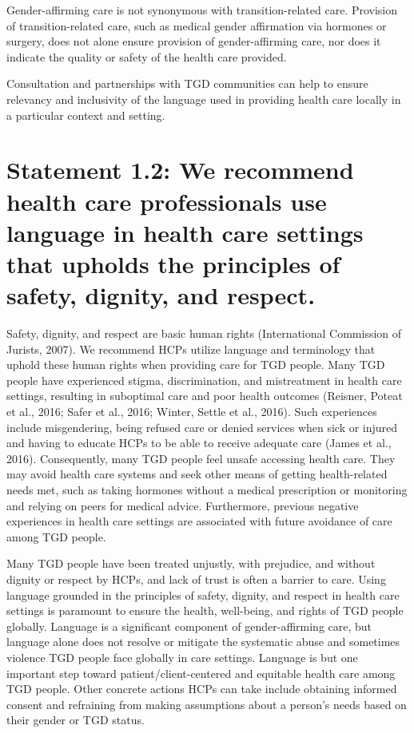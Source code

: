 \documentclass[
]{book}
\begin{document}
Gender-affirming care is not synonymous with
transition-related care. Provision of transition-related
care, such as medical gender affirmation via hormones or surgery, does not alone ensure provision
of gender-affirming care, nor does it indicate the
quality or safety of the health care provided.

Consultation and partnerships with TGD communities can help to ensure relevancy and inclusivity of the language used in providing health
care locally in a particular context and setting.

\hypertarget{statement-1.2-we-recommend-health-care-professionals-use-language-in-health-care-settings-that-upholds-the-principles-of-safety-dignity-and-respect.}{%
\section*{Statement 1.2: We recommend health care professionals use language in health care settings that upholds the principles of safety, dignity, and respect.}\label{statement-1.2-we-recommend-health-care-professionals-use-language-in-health-care-settings-that-upholds-the-principles-of-safety-dignity-and-respect.}}

Safety, dignity, and respect are basic human
rights (International Commission of Jurists, 2007).
We recommend HCPs utilize language and terminology that uphold these human rights when providing care for TGD people. Many TGD people
have experienced stigma, discrimination, and mistreatment in health care settings, resulting in suboptimal care and poor health outcomes (Reisner,
Poteat et al., 2016; Safer et al., 2016; Winter, Settle
et al., 2016). Such experiences include misgendering, being refused care or denied services when
sick or injured and having to educate HCPs to be
able to receive adequate care (James et al., 2016).
Consequently, many TGD people feel unsafe
accessing health care. They may avoid health care
systems and seek other means of getting
health-related needs met, such as taking hormones
without a medical prescription or monitoring and
relying on peers for medical advice. Furthermore,
previous negative experiences in health care settings are associated with future avoidance of care
among TGD people.

Many TGD people have been treated unjustly,
with prejudice, and without dignity or respect by
HCPs, and lack of trust is often a barrier to care.
Using language grounded in the principles of
safety, dignity, and respect in health care settings
is paramount to ensure the health, well-being,
and rights of TGD people globally. Language is
a significant component of gender-affirming care,
but language alone does not resolve or mitigate
the systematic abuse and sometimes violence
TGD people face globally in care settings.
Language is but one important step toward
patient/client-centered and equitable health care
among TGD people. Other concrete actions HCPs
can take include obtaining informed consent and
refraining from making assumptions about a person's needs based on their gender or TGD status.
\end{document}
